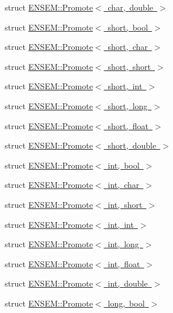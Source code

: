 \begin{DoxyCompactItemize}
\item 
struct \mbox{\hyperlink{structENSEM_1_1Promote_3_01char_00_01double_01_4}{E\+N\+S\+E\+M\+::\+Promote$<$ char, double $>$}}
\item 
struct \mbox{\hyperlink{structENSEM_1_1Promote_3_01short_00_01bool_01_4}{E\+N\+S\+E\+M\+::\+Promote$<$ short, bool $>$}}
\item 
struct \mbox{\hyperlink{structENSEM_1_1Promote_3_01short_00_01char_01_4}{E\+N\+S\+E\+M\+::\+Promote$<$ short, char $>$}}
\item 
struct \mbox{\hyperlink{structENSEM_1_1Promote_3_01short_00_01short_01_4}{E\+N\+S\+E\+M\+::\+Promote$<$ short, short $>$}}
\item 
struct \mbox{\hyperlink{structENSEM_1_1Promote_3_01short_00_01int_01_4}{E\+N\+S\+E\+M\+::\+Promote$<$ short, int $>$}}
\item 
struct \mbox{\hyperlink{structENSEM_1_1Promote_3_01short_00_01long_01_4}{E\+N\+S\+E\+M\+::\+Promote$<$ short, long $>$}}
\item 
struct \mbox{\hyperlink{structENSEM_1_1Promote_3_01short_00_01float_01_4}{E\+N\+S\+E\+M\+::\+Promote$<$ short, float $>$}}
\item 
struct \mbox{\hyperlink{structENSEM_1_1Promote_3_01short_00_01double_01_4}{E\+N\+S\+E\+M\+::\+Promote$<$ short, double $>$}}
\item 
struct \mbox{\hyperlink{structENSEM_1_1Promote_3_01int_00_01bool_01_4}{E\+N\+S\+E\+M\+::\+Promote$<$ int, bool $>$}}
\item 
struct \mbox{\hyperlink{structENSEM_1_1Promote_3_01int_00_01char_01_4}{E\+N\+S\+E\+M\+::\+Promote$<$ int, char $>$}}
\item 
struct \mbox{\hyperlink{structENSEM_1_1Promote_3_01int_00_01short_01_4}{E\+N\+S\+E\+M\+::\+Promote$<$ int, short $>$}}
\item 
struct \mbox{\hyperlink{structENSEM_1_1Promote_3_01int_00_01int_01_4}{E\+N\+S\+E\+M\+::\+Promote$<$ int, int $>$}}
\item 
struct \mbox{\hyperlink{structENSEM_1_1Promote_3_01int_00_01long_01_4}{E\+N\+S\+E\+M\+::\+Promote$<$ int, long $>$}}
\item 
struct \mbox{\hyperlink{structENSEM_1_1Promote_3_01int_00_01float_01_4}{E\+N\+S\+E\+M\+::\+Promote$<$ int, float $>$}}
\item 
struct \mbox{\hyperlink{structENSEM_1_1Promote_3_01int_00_01double_01_4}{E\+N\+S\+E\+M\+::\+Promote$<$ int, double $>$}}
\item 
struct \mbox{\hyperlink{structENSEM_1_1Promote_3_01long_00_01bool_01_4}{E\+N\+S\+E\+M\+::\+Promote$<$ long, bool $>$}}

\end{DoxyCompactItemize}
